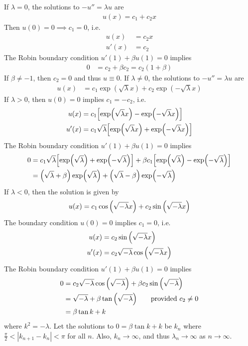 \documentclass{article} %
\theoremstyle{plain}
\begin{document}
If $\lambda = 0$, the solutions to $-u'' = \lambda u$ are
\begin{align*}
    u(x) = c_1 + c_2 x
\end{align*}
Then $u(0) = 0 \implies c_1 = 0$, i.e.
\begin{align*}
    u(x) &= c_2 x \\
    u'(x) &= c_2
\end{align*}
The Robin boundary condition $u'(1) + \beta u(1) = 0$ implies
\begin{align*}
    0 &= c_2 + \beta c_2 = c_2(1 + \beta)
\end{align*}
If $\beta \neq -1$, then $c_2 = 0$ and thus $u \equiv 0$.  If $\lambda \neq 0$, the solutions to $-u'' = \lambda u$ are
\begin{align*}
    u(x) &= c_1\exp(\sqrt{\lambda}x) + c_2\exp(-\sqrt{\lambda}x)
\end{align*}
If $\lambda > 0$, then $u(0) = 0$ implies $c_1 = -c_2$, i.e.
\begin{align*}
    u(x) &= c_1\qty[\exp(\sqrt{\lambda}x) - \exp(-\sqrt{\lambda}x)] \\
    u'(x) &= c_1\sqrt{\lambda}\qty[\exp(\sqrt{\lambda}x) + \exp(-\sqrt{\lambda}x)]
\end{align*}
The Robin boundary condition $u'(1) + \beta u(1) = 0$ implies
\begin{align*}
    0 &= c_1\sqrt{\lambda}\qty[\exp(\sqrt{\lambda}) + \exp(-\sqrt{\lambda})] + \beta c_1 \qty[\exp(\sqrt{\lambda}) - \exp(-\sqrt{\lambda})] \\
    &= \qty(\sqrt{\lambda} + \beta)\exp(\sqrt{\lambda}) + \qty(\sqrt{\lambda} - \beta)\exp(-\sqrt{\lambda})
\end{align*}
If $\lambda < 0$, then the solution is given by
\begin{align*}
    u(x) = c_1\cos\qty(\sqrt{-\lambda}x) + c_2\sin\qty(\sqrt{-\lambda}x)
\end{align*}
The boundary condition $u(0) = 0$ implies $c_1 = 0$, i.e.
\begin{align*}
    u(x) &= c_2\sin\qty(\sqrt{-\lambda}x) \\
    u'(x) &= c_2\sqrt{-\lambda}\cos\qty(\sqrt{-\lambda}x)
\end{align*}
The Robin boundary condition $u'(1) + \beta u(1) = 0$ implies
\begin{align*}
    0 &= c_2\sqrt{-\lambda}\cos\qty(\sqrt{-\lambda}) + \beta c_2\sin\qty(\sqrt{-\lambda}) \\
    &= \sqrt{-\lambda} +\beta\tan\qty(\sqrt{-\lambda})\qquad \text{provided $c_2 \neq 0$} \\
    &= \beta\tan k + k
\end{align*}
where $k^2 = -\lambda$.  Let the solutions to $0 = \beta \tan k + k$ be $k_n$ where $\frac{\pi}{2} < |k_{n+1} - k_n| < \pi$ for all $n$.  Also, $k_n \rightarrow \infty$, and thus $\lambda_n \rightarrow \infty$ as $n \rightarrow \infty$.
\end{document}
